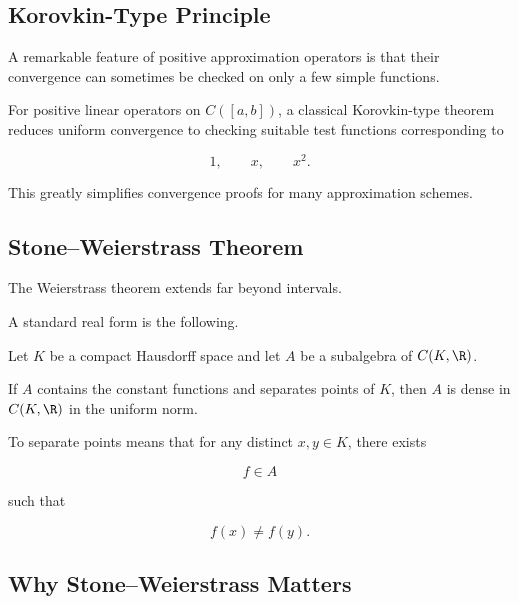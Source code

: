 \subsection{Korovkin-Type Principle}
\label{subsec:korovkin-principle}

A remarkable feature of positive approximation operators is that their
convergence can sometimes be checked on only a few simple functions.

For positive linear operators on \(C([a,b])\), a classical
Korovkin-type theorem reduces uniform convergence to checking suitable
test functions corresponding to

\[
\boxed{
1,
\qquad
x,
\qquad
x^2.
}
\]

This greatly simplifies convergence proofs for many approximation
schemes.

\subsection{Stone--Weierstrass Theorem}
\label{subsec:stone-weierstrass}

The Weierstrass theorem extends far beyond intervals.

A standard real form is the following.

\begin{theorem}
Let \(K\) be a compact Hausdorff space and let \(A\) be a subalgebra of
\(C(K,\R)\).

If \(A\) contains the constant functions and separates points of \(K\),
then \(A\) is dense in \(C(K,\R)\) in the uniform norm.
\end{theorem}

To separate points means that for any distinct \(x,y\in K\), there exists

\[
f\in A
\]

such that

\[
\boxed{
f(x)\neq f(y).
}
\]

\subsection{Why Stone--Weierstrass Matters}
\label{subsec:why-stone-weierstrass}


